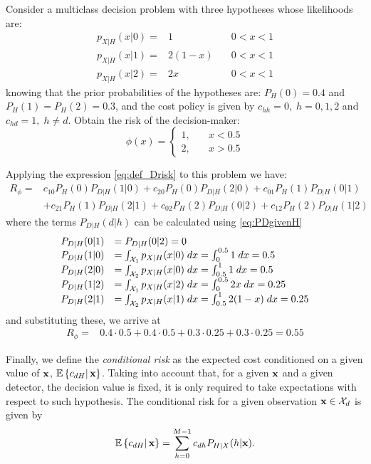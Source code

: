 \begin{example} \label{ex_dec1}
Consider a multiclass decision problem with three hypotheses whose likelihoods are:
$$\begin{array}{lll}
p_{X|H}(x|0)= & 1 &  \quad 0<x<1 \\ 
p_{X|H}(x|1)= & 2(1-x)  &  \quad 0<x<1 \\ 
p_{X|H}(x|2)= & 2x & \quad 0<x<1 
\end{array} $$
knowing that the prior probabilities of the hypotheses are: $P_H(0)=0.4$ and $P_H(1)=P_H(2)=0.3$, and the cost policy is given by $c_{hh}=0, \; h=0,1,2$ and $c_{hd}=1, \; h \neq d$. Obtain the risk of the decision-maker:
$$ \phi (x) = \left\lbrace  \begin{array}{ll}    
1, & \quad x<0.5 \\
2, & \quad x>0.5 
\end{array} 
\right. $$

Applying the expression \eqref{eq:def_Drisk} to this problem we have:
$$\begin{array}{rl}
R_\phi = &  c_{10} P_H(0) P_{D|H}(1|0) + c_{20} P_H(0) P_{D|H}(2|0) + c_{01} P_H(1) P_{D|H}(0|1) \\
& +  c_{21} P_H(1) P_{D|H}(2|1) +  c_{02} P_H(2) P_{D|H}(0|2) +   c_{12} P_H(2) P_{D|H}(1|2) 
\end{array} $$
where the terms $P_{D|H}(d|h)$ can be calculated using \eqref{eq:PDgivenH}
$$\begin{array}{ll}
P_{D|H}(0|1) &=P_{D|H}(0|2)= 0  \\
P_{D|H}(1|0) &= \int_{{\cal X}_1} p_{{X}|H}({x}|0) \;d{x} = \int_{0}^{0.5} 1 \;d{x} = 0.5 \\ 
P_{D|H}(2|0) &= \int_{{\cal X}_2} p_{{X}|H}({x}|0)\; d{x} = \int_{0.5}^{1} 1 \;d{x} = 0.5 \\
P_{D|H}(1|2) &=\int_{{\cal X}_1} p_{{X}|H}({x}|2) \;d{x} = \int_{0}^{0.5} 2x \;d{x} = 0.25 \\
P_{D|H}(2|1) &=\int_{{\cal X}_2} p_{{X}|H}({x}|1) \;d{x} = \int_{0.5}^{1} 2(1-x) \;d{x} = 0.25 
\end{array} $$
and substituting these, we arrive at
$$\begin{array}{rl}
R_\phi = &  0.4 \cdot 0.5  + 0.4 \cdot 0.5 + 0.3 \cdot 0.25 + 0.3 \cdot 0.25 = 0.55
\end{array} $$
\end{example}
\vspace{0.2cm}

Finally, we define the \textit{conditional risk} as the expected cost conditioned on a given value of ${\bf x}$, $\mathbb{E}\left\{c_{dH}\right|{\bf x}\}$. Taking into account that, for a given ${\bf x}$ and a given detector, the decision value is fixed, it is only required to take expectations with respect to such hypothesis. The conditional risk for a given observation ${\bf x} \in {\cal X}_d$ is given by
\begin{equation}
\mathbb{E}\left\{ c_{dH}\right|{\bf x}\} = \sum_{h=0}^{M-1} c_{dh} P_{H|X}(h|{\bf x}).
\label{eq:cost_x}
\end{equation}

